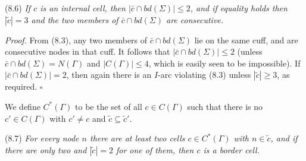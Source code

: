 \stmt
(8.6) \textit{If $c$ is an internal cell, then $|\bar{c} \cap bd(\Sigma)| \le 2$, and if equality holds then $|\tilde{c}| = 3$ and the two members of $\bar{c} \cap bd(\Sigma)$ are consecutive.}

\textit{Proof.} From (8.3), any two members of $\bar{c} \cap bd(\Sigma)$ lie on the same cuff, and are consecutive nodes in that cuff. It follows that $|\bar{c} \cap bd(\Sigma)| \le 2$ (unless $\bar{c} \cap bd(\Sigma) = N(\Gamma)$ and $|C(\Gamma)| \le 4$, which is easily seen to be impossible). If $|\bar{c} \cap bd(\Sigma)| = 2$, then again there is an $I$-arc violating (8.3) unless $|\tilde{c}| \ge 3$, as required. $\square$

We define $C^*(\Gamma)$ to be the set of all $c \in C(\Gamma)$ such that there is no $c' \in C(\Gamma)$ with $c' \ne c$ and $\tilde{c} \subseteq \tilde{c}'$.

\stmt
(8.7) \textit{For every node $n$ there are at least two cells $c \in C^*(\Gamma)$ with $n \in \tilde{c}$, and if there are only two and $|\tilde{c}| = 2$ for one of them, then $c$ is a border cell.}
